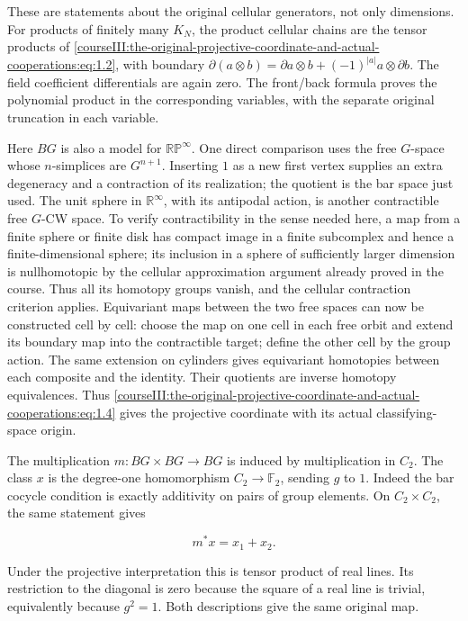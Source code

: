 These are statements about the original cellular generators, not only dimensions. For products of finitely many \(K_N\), the product cellular chains are the tensor products of \eqref{courseIII:the-original-projective-coordinate-and-actual-cooperations:eq:1.2}, with boundary \(\partial(a\otimes b)=\partial a\otimes b+(-1)^{|a|}a\otimes\partial b\). The field coefficient differentials are again zero. The front/back formula proves the polynomial product in the corresponding variables, with the separate original truncation in each variable.

Here \(BG\) is also a model for \(\mathbb{RP}^{\infty}\). One direct comparison uses the free \(G\)-space whose \(n\)-simplices are \(G^{n+1}\). Inserting \(1\) as a new first vertex supplies an extra degeneracy and a contraction of its realization; the quotient is the bar space just used. The unit sphere in \(\mathbb R^{\infty}\), with its antipodal action, is another contractible free \(G\)-CW space. To verify contractibility in the sense needed here, a map from a finite sphere or finite disk has compact image in a finite subcomplex and hence a finite-dimensional sphere; its inclusion in a sphere of sufficiently larger dimension is nullhomotopic by the cellular approximation argument already proved in the course. Thus all its homotopy groups vanish, and the cellular contraction criterion applies. Equivariant maps between the two free spaces can now be constructed cell by cell: choose the map on one cell in each free orbit and extend its boundary map into the contractible target; define the other cell by the group action. The same extension on cylinders gives equivariant homotopies between each composite and the identity. Their quotients are inverse homotopy equivalences. Thus \eqref{courseIII:the-original-projective-coordinate-and-actual-cooperations:eq:1.4} gives the projective coordinate with its actual classifying-space origin.

The multiplication \(m:BG\times BG\to BG\) is induced by multiplication in \(C_2\). The class \(x\) is the degree-one homomorphism \(C_2\to\mathbb F_2\), sending \(g\) to \(1\). Indeed the bar cocycle condition is exactly additivity on pairs of group elements. On \(C_2\times C_2\), the same statement gives

\begin{equation}
m^*x=x_1+x_2.
 \label{courseIII:the-original-projective-coordinate-and-actual-cooperations:eq:1.5}
\end{equation}

Under the projective interpretation this is tensor product of real lines. Its restriction to the diagonal is zero because the square of a real line is trivial, equivalently because \(g^2=1\). Both descriptions give the same original map.

